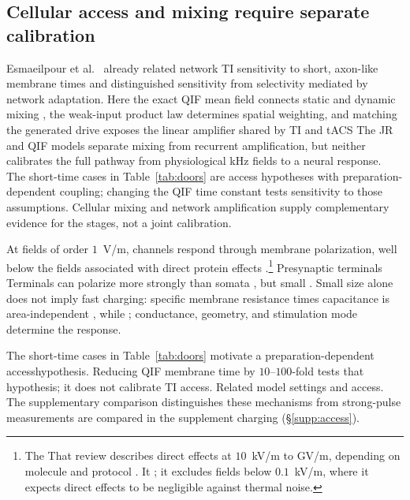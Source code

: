 \documentclass[11pt,a4paper]{article}
\newif\ifjne
\providecommand{\DIFaddtex}[1]{{\protect\color{blue} \sf #1}} %
\providecommand{\DIFdeltex}[1]{{\protect\color{red} \scriptsize #1}} %
\providecommand{\DIFaddbegin}{} %
\providecommand{\DIFaddend}{} %
\providecommand{\DIFdelbegin}{} %
\providecommand{\DIFdelend}{} %
\providecommand{\DIFadd}[1]{\texorpdfstring{\DIFaddtex{#1}}{#1}} %
\providecommand{\DIFdel}[1]{\texorpdfstring{\DIFdeltex{#1}}{}} %
\begin{document}
\subsection{Cellular access and mixing require separate calibration}
\DIFdelbegin \DIFdel{Esmaeilpour et al.\
\cite{esmaeilpour2021} already related network TI sensitivity to short, axon-like
membrane times and distinguished sensitivity from selectivity mediated by
network adaptation.
Here the exact QIF mean field connects static and dynamic
mixing , the weak-input product law determines spatial weighting, and matching
the generated drive exposes the linear amplifier shared by TI and tACS}\DIFdelend \DIFaddbegin \DIFadd{The JR and QIF models separate mixing from recurrent amplification, but neither
calibrates the full pathway from physiological kHz fields to a neural response.
The short-time cases in Table~\ref{tab:doors} are access hypotheses with
preparation-dependent coupling; changing the QIF time constant tests sensitivity
to those assumptions. Cellular mixing \cite{mirzakhalili2020,luff2024mixer}
and network amplification \cite{caldas2024,karimi2024,esmaeilpour2021} supply
complementary evidence for the stages, not a joint calibration}\DIFaddend .

At fields of order $1$~V/m, channels respond through membrane polarization,
well below \DIFdelbegin \DIFdel{the }\DIFdelend fields associated with direct protein effects
\cite{cifra2026}.\footnote{\DIFdelbegin \DIFdel{The }\DIFdelend \DIFaddbegin \DIFadd{That }\DIFaddend review describes direct effects at $10$~kV/m
to GV/m, depending on molecule and protocol\DIFdelbegin \DIFdel{. It }\DIFdelend \DIFaddbegin \DIFadd{; it }\DIFaddend excludes fields below
$0.1$~kV/m, where it expects direct effects to be negligible against thermal noise.}
\DIFdelbegin \DIFdel{Presynaptic terminals }\DIFdelend \DIFaddbegin \DIFadd{Terminals }\DIFaddend can polarize more strongly than somata
\cite{rahman2013,aberra2023,chakraborty2018}\DIFdelbegin \DIFdel{, but small
}\DIFdelend \DIFaddbegin \DIFadd{. Small }\DIFaddend size alone does not imply
fast charging: specific membrane resistance times capacitance is area-independent\DIFdelbegin \DIFdel{, while }\DIFdelend \DIFaddbegin \DIFadd{;
}\DIFaddend conductance, geometry, and stimulation mode determine \DIFdelbegin \DIFdel{the response.
}%

\DIFdel{The short-time cases in Table~\ref{tab:doors} motivate a preparation-dependent
accesshypothesis. Reducing QIF membrane time by $10$--$100$-fold tests that
hypothesis; it does not calibrate TI access. Related model settings and }\DIFdelend \DIFaddbegin \DIFadd{access. The supplementary
comparison distinguishes these mechanisms from }\DIFaddend strong-pulse \DIFdelbegin \DIFdel{measurements are compared in the supplement }\DIFdelend \DIFaddbegin \DIFadd{charging
}\DIFaddend (\S\ref{supp:access}).
\ifjne\else
\end{document}

